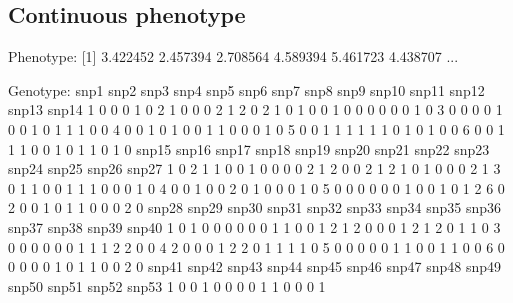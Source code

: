 \documentclass{article}
\begin{document}
\subsection{Continuous phenotype}

\begin{Schunk}
\begin{Soutput}
Phenotype:
[1] 3.422452 2.457394 2.708564 4.589394 5.461723 4.438707
...

Genotype:
  snp1 snp2 snp3 snp4 snp5 snp6 snp7 snp8 snp9 snp10 snp11 snp12 snp13 snp14
1    0    0    0    1    0    2    1    0    0     0     2     1     2     0
2    1    0    1    0    0    1    0    0    0     0     0     0     1     0
3    0    0    0    0    1    0    0    1    0     1     1     1     0     0
4    0    0    1    0    1    0    0    1    1     0     0     0     1     0
5    0    0    1    1    1    1    1    1    0     1     0     1     0     0
6    0    0    1    1    1    0    0    1    0     1     1     0     1     0
  snp15 snp16 snp17 snp18 snp19 snp20 snp21 snp22 snp23 snp24 snp25 snp26 snp27
1     0     2     1     1     0     0     1     0     0     0     0     2     1
2     0     0     2     1     2     1     0     1     0     0     0     2     1
3     0     1     1     0     0     1     1     1     0     0     0     1     0
4     0     0     1     0     0     2     0     1     0     0     0     1     0
5     0     0     0     0     0     0     1     0     0     1     0     1     2
6     0     2     0     0     1     0     1     1     0     0     0     2     0
  snp28 snp29 snp30 snp31 snp32 snp33 snp34 snp35 snp36 snp37 snp38 snp39 snp40
1     0     1     0     0     0     0     0     0     1     1     0     0     1
2     1     2     0     0     0     1     2     1     2     0     1     1     0
3     0     0     0     0     0     0     1     1     1     2     2     0     0
4     2     0     0     0     1     2     2     0     1     1     1     1     0
5     0     0     0     0     0     1     1     0     0     1     1     0     0
6     0     0     0     0     0     1     0     1     1     0     0     2     0
  snp41 snp42 snp43 snp44 snp45 snp46 snp47 snp48 snp49 snp50 snp51 snp52 snp53
1     0     0     1     0     0     0     0     1     1     0     0     0     1

\end{Soutput}
\end{Schunk}
\end{document}
